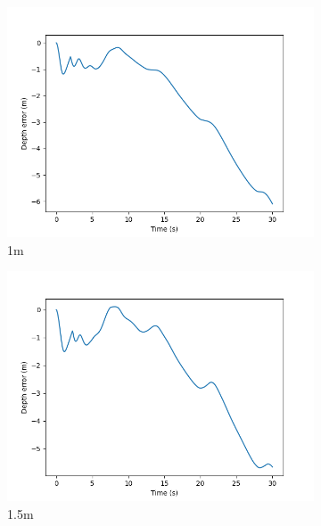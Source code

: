 \documentclass[class=article, crop=false]{standalone}
\begin{document}
\begin{figure}
\begin{subfigure}[b]{0.48\textwidth}
        \includegraphics{scenario1/rov-100m/1.0m/rov_depth_error_uncontrolled}
        \caption{1m}
        \label{}
    \end{subfigure}
    \hfill
    \begin{subfigure}[b]{0.48\textwidth}
        \centering
        \includegraphics{scenario1/rov-100m/1.5m/rov_depth_error_uncontrolled}
        \caption{1.5m}
        \label{}
    \end{subfigure}
    \vfill
    \begin{subfigure}[b]{0.48\textwidth}
        \centering

\end{subfigure}
\end{figure}
\end{document}
